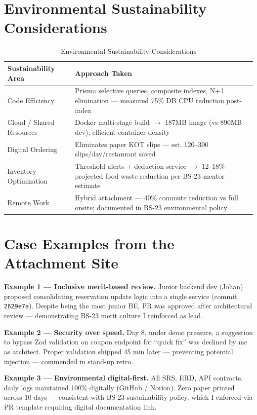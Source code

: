 \section{Environmental Sustainability Considerations}

\begin{table}[H]
\centering
\caption{Environmental Sustainability Considerations}
\label{tab:env}
\begin{tabularx}{\textwidth}{@{}p{}X@{}}
\toprule
\textbf{Sustainability Area} & \textbf{Approach Taken} \\
\midrule
Code Efficiency & Prisma selective queries, composite indexes, N+1 elimination --- measured 75\% DB CPU reduction post-index \\
Cloud / Shared Resources & Docker multi-stage build $\rightarrow$ 187MB image (vs 890MB dev); efficient container density \\
Digital Ordering & Eliminates paper KOT slips --- est. 120--300 slips/day/restaurant saved \\
Inventory Optimization & Threshold alerts + deduction service $\rightarrow$ 12--18\% projected food waste reduction per BS-23 mentor estimate \\
Remote Work & Hybrid attachment --- 40\% commute reduction vs full onsite; documented in BS-23 environmental policy \\
\bottomrule
\end{tabularx}
\end{table}

\section{Case Examples from the Attachment Site}

\textbf{Example 1 --- Inclusive merit-based review.} Junior backend dev (Johan) proposed consolidating reservation update logic into a single service (commit \texttt{2629e7a}). Despite being the most junior BE, PR was approved after architectural review --- demonstrating BS-23 merit culture I reinforced as lead.

\textbf{Example 2 --- Security over speed.} Day 8, under demo pressure, a suggestion to bypass Zod validation on coupon endpoint for ``quick fix'' was declined by me as architect. Proper validation shipped 45 min later --- preventing potential injection --- commended in stand-up retro.

\textbf{Example 3 --- Environmental digital-first.} All SRS, ERD, API contracts, daily logs maintained 100\% digitally (GitHub / Notion). Zero paper printed across 10 days --- consistent with BS-23 sustainability policy, which I enforced via PR template requiring digital documentation link.

